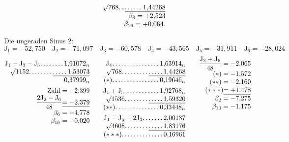 \begin{landscape}
\[\begin{array}{@{}r@{\qquad}r@{}}
&\BareRoot{768}\VfourDots{1}\underline{\VfourDots{5}1{,}44268}\\
&\beta_8=+2{,}523\\
&\beta_{16}=+0{,}064.
\end{array}
\]
\par\noindent\hspace*{\parindent}Die ungeraden Sinus 2:
\[\mathrm{J}_1=-52{,}750\quad\mathrm{J}_2=-71{,}097\quad\mathrm{J}_3=-60{,}578\quad\mathrm{J}_4=-43{,}565\quad\mathrm{J}_5=-31{,}911\quad\mathrm{J}_6=-28{,}024\]
\[
\begin{array}{@{}r@{\qquad}r@{\qquad}r@{}}
\begin{array}[t]{@{}r@{}}
\mathrm{J}_1+\mathrm{J}_3-\mathrm{J}_5\VfourDots{7}1{,}91072_n\\
\BareRoot{1152}\VfourDots{7}\underline{\VfourDots{4}1{,}53073}\\
0{,}37999_n\\[4pt]
\text{Zahl}=-2{,}399\\
\dfrac{2\mathrm{J}_2-\mathrm{J}_6}{48}\underline{=-2{,}379}\\
\beta_6=-4{,}778\\
\beta_{18}=-0{,}020
\end{array}
&\begin{array}[t]{@{}r@{}}
\mathrm{J}_4\VfourDots{15}1{,}63914_n\\
\BareRoot{768}\VfourDots{8}\underline{\VfourDots{4}1{,}44268}\\
(*)\VfourDots{15}0{,}19646_n\\[4pt]
\mathrm{J}_1+\mathrm{J}_5\VfourDots{11}1{,}92768_n\\
\BareRoot{1536}\VfourDots{7}\underline{\VfourDots{4}1{,}59320}\\
(**)\VfourDots{14}0{,}33448_n\\[4pt]
\mathrm{J}_1-\mathrm{J}_5-2\mathrm{J}_3\VfourDots{6}2{,}00137\\
\BareRoot{4608}\VfourDots{7}\underline{\VfourDots{4}1{,}83176}\\
(***)\VfourDots{13}0{,}16961
\end{array}
&\begin{array}[t]{@{}r@{}}
\dfrac{\mathrm{J}_2+\mathrm{J}_6}{48}=-2{,}065\\
(*)=-1{,}572\\
(**)=-2{,}160\\
(***)\underline{=+1{,}478}\\
\beta_2=-7{,}275\\
\beta_{10}=-1{,}175\\

\end{array}
\end{array}\]
\end{landscape}

